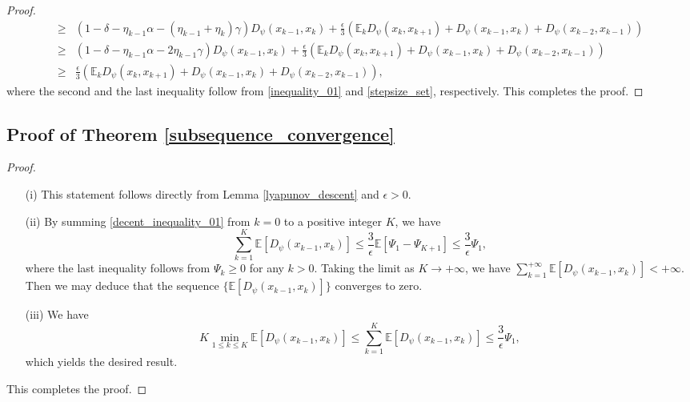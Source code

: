 \documentclass[letterpaper]{article} %
\begin{document}
\begin{proof}
\begin{align*}
			\ge&\left(1-\delta-\eta_{k-1}\alpha-(\eta_{k-1}+\eta_{k})\gamma\right)D_{\psi}(x_{k-1},x_{k})
			+\frac{\epsilon}{3}(\mathbb{E}_{k}D_{\psi}(x_{k},x_{k+1})+D_{\psi}(x_{k-1},x_{k})+D_{\psi}(x_{k-2},x_{k-1}))\\
			\ge&\left(1-\delta-\eta_{k-1}\alpha-2\eta_{k-1}\gamma\right)D_{\psi}(x_{k-1},x_{k})
			+\frac{\epsilon}{3}(\mathbb{E}_{k}D_{\psi}(x_{k},x_{k+1})+D_{\psi}(x_{k-1},x_{k})+D_{\psi}(x_{k-2},x_{k-1}))\\
			\ge&\frac{\epsilon}{3}(\mathbb{E}_{k}D_{\psi}(x_{k},x_{k+1})+D_{\psi}(x_{k-1},x_{k})+D_{\psi}(x_{k-2},x_{k-1})),
		\end{align*}
		where the second   and the last inequality follow from \eqref{inequality_01} and \eqref{stepsize_set}, respectively. This completes the proof.
	\end{proof}
	\subsection{Proof of  Theorem \ref{subsequence_convergence}}
	\begin{proof}
		\begin{itemize}
			\item[(i)] This statement  follows   directly from Lemma \ref{lyapunov_descent} and $\epsilon>0$.
			\item[(ii)] By  summing \eqref{decent_inequality_01} from $k=0$ to a positive integer $K$, we have
			\[
			\sum_{k=1}^{K}\mathbb{E}[D_{\psi}(x_{k-1},x_{k})]\le \frac{3}{\epsilon}\mathbb{E}[\Psi_{1}-\Psi_{K+1}]\le \frac{3}{\epsilon}\Psi_{1},
			\]
			where the last inequality follows from $\Psi_{k}\ge 0$ for any $k>0$. Taking the limit as $K\rightarrow+\infty$, we have $\sum_{k=1}^{+\infty}\mathbb{E}[D_{\psi}(x_{k-1},x_{k})]<+\infty$. Then we may deduce that  the sequence $\{\mathbb{E}[ D_{\psi}(x_{k-1}, x_{k})]\}$ converges to zero.
			\item[(iii)] We have
			\[
			K\min_{1\le k\le K}\mathbb{E}[D_{\psi}(x_{k-1},x_{k})]\le\sum_{k=1}^{K}\mathbb{E}[D_{\psi}(x_{k-1},x_{k})]\le\frac{3}{\epsilon}\Psi_{1},
			\]
			which yields the desired result.
		\end{itemize}
		This completes the proof.
	\end{proof}


\end{document}
